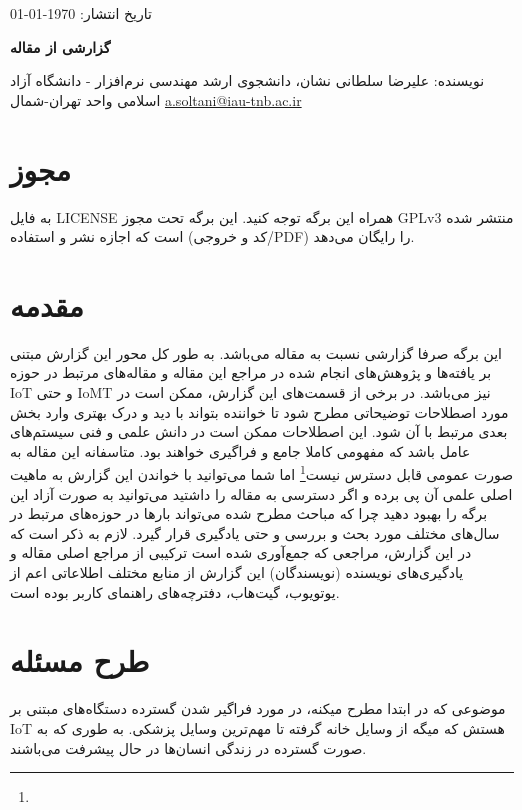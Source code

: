 \documentclass[10pt, a4paper]{article}
\begin{document}
تاریخ انتشار: \today

\textbf{گزارشی از مقاله }

نویسنده: علیرضا سلطانی نشان، دانشجوی ارشد مهندسی نرم‌افزار - دانشگاه آزاد اسلامی
واحد تهران-شمال \href{mailto:a.soltani@iau-tnb.ac.ir}{a.soltani@iau-tnb.ac.ir}

\tableofcontents

\section{مجوز}

به فایل LICENSE همراه این برگه توجه کنید. این برگه تحت مجوز GPLv3 منتشر شده است
که اجازه نشر و استفاده (کد و خروجی/PDF) را رایگان می‌دهد.

\section{مقدمه}

این برگه صرفا گزارشی نسبت به مقاله  می‌باشد. به طور کل محور این گزارش مبتنی بر یافته‌ها و پژوهش‌های
انجام شده در مراجع این مقاله و مقاله‌های مرتبط در حوزه IoT و حتی IoMT نیز
می‌باشد. در برخی از قسمت‌های این گزارش، ممکن است در مورد اصطلاحات توضیحاتی مطرح
شود تا خواننده بتواند با دید و درک بهتری وارد بخش بعدی مرتبط با آن شود. این
اصطلاحات ممکن است در دانش علمی و فنی سیستم‌های عامل باشد که مفهومی کاملا جامع و
فراگیری خواهند بود. متاسفانه این مقاله به صورت عمومی قابل دسترس
نیست\footnote{} اما شما می‌توانید با خواندن این گزارش به ماهیت
اصلی علمی آن پی برده و اگر دسترسی به مقاله را داشتید می‌توانید به صورت آزاد این
برگه را بهبود دهید چرا که مباحث مطرح شده می‌تواند بار‌ها در حوزه‌های مرتبط در
سال‌های مختلف مورد بحث و بررسی و حتی یادگیری قرار گیرد. لازم به ذکر است که در
این گزارش، مراجعی که جمع‌آوری شده است ترکیبی از مراجع اصلی مقاله و یادگیری‌های
نویسنده (نویسندگان) این گزارش از منابع مختلف اطلاعاتی اعم از یوتویوب، گیت‌هاب،
دفترچه‌های راهنمای کاربر بوده است.

\section{طرح مسئله}

موضوعی که در ابتدا مطرح میکنه، در مورد فراگیر شدن گسترده دستگاه‌های مبتنی بر IoT
هستش که میگه از وسایل خانه گرفته تا مهم‌ترین وسایل پزشکی. به طوری که به صورت
گسترده در زندگی انسان‌ها در حال پیشرفت می‌باشند. 
\end{document}
